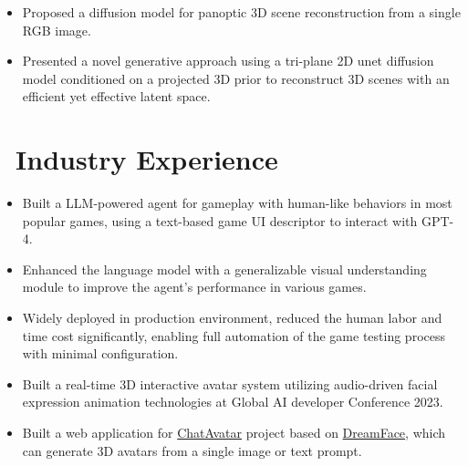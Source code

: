\documentclass{resume}
\begin{document}

\begin{itemize}
  \item Proposed a diffusion model for panoptic 3D scene reconstruction from a single RGB image.
  \item Presented a novel generative approach using a tri-plane 2D unet diffusion model conditioned on a projected 3D prior to reconstruct 3D scenes with an efficient yet effective latent space.
\end{itemize}

\section{\faUsers\ Industry Experience}


\begin{itemize}
  \item Built a LLM-powered agent for gameplay with human-like behaviors in most popular games, using a text-based game UI descriptor to interact with GPT-4.
  \item Enhanced the language model with a generalizable visual understanding module to improve the agent's performance in various games.
  \item Widely deployed in production environment, reduced the human labor and time cost significantly, enabling full automation of the game testing process with minimal configuration.
\end{itemize}
\vspace{-0.5em}


\begin{itemize}
  \item Built a real-time 3D interactive avatar system utilizing audio-driven facial expression animation technologies at Global AI developer Conference 2023.
  \item Built a web application for \href{https://hyperhuman.deemos.com/}{ChatAvatar} project based on \href{https://dl.acm.org/doi/abs/10.1145/3592094}{DreamFace}, which can generate 3D avatars from a single image or text prompt.
\end{itemize}
\vspace{-0.5em}
\end{document}
